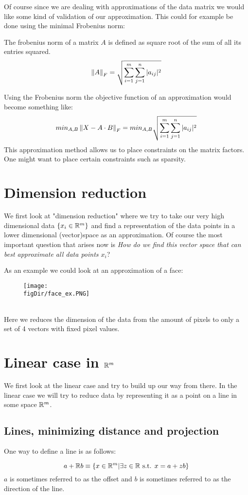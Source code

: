 Of course since we are dealing with approximations of the data matrix we would like some kind of validation of our approximation. This could for example be done using the minimal Frobenius norm:
		\begin{defn}
			The frobenius norm of a matrix $A$ is defined as square root of the sum of all its entries squared.
			\begin{equation}
			\left\lVert A\right\rVert_F = \sqrt{\sum_{i=1}^{m}\sum_{j=1}^{n}|a_{ij}|^2}
			\end{equation}
		\end{defn}
		Using the Frobenius norm the objective function of an approximation would become something like:
			\begin{equation}
			min_{A,B} \left\lVert X -A\cdot B\right\rVert_F = min_{A,B} \sqrt{\sum_{i=1}^{m}\sum_{j=1}^{n}|a_{ij}|^2}
			\end{equation}
		This approximation method allows us to place constraints on the matrix factors. One might want to place certain constraints such as sparsity.
		
	\section{Dimension reduction}
		We first look at "dimension reduction" where we try to take our very high dimensional data $\{x_i \in \mathbb{R}^m\}$ and find a representation of the data points in a lower dimensional (vector)space as an approximation. Of course the most important question that arises now is \textit{How do we find this vector space that can best approximate all data points $x_i$}?
		\begin{exmp}
			As an example we could look at an approximation of a face:
			\begin{figure}[h!]
				\centering
				\texttt{[image: \\figDir/face\_ex.PNG]}
			\end{figure}\\
			Here we reduces the dimension of the data from the amount of pixels to only a set of 4 vectors with fixed pixel values.
		\end{exmp}
		\section{Linear case in $\mathbb{R}^m$}
		We first look at the linear case and try to build up our way from there. In the linear case we will try to reduce data by representing it as a point on a line in some space $\mathbb{R}^m$.
		\subsection{Lines, minimizing distance and projection}
			One way to define a line is as follows:
			\begin{defn}
				\begin{equation}
				a + \mathbb{R} b \equiv \{x \in \mathbb{R}^m | \exists z \in \mathbb{R} \text{ s.t. } x = a + zb\}
				\end{equation}
				$a$ is sometimes referred to as the offset and $b$ is sometimes referred to as the direction of the line.
			\end{defn}
			
